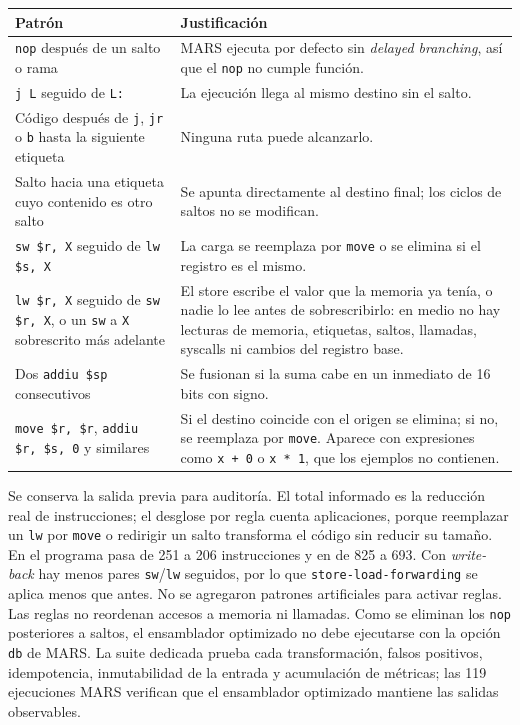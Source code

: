 \documentclass[11pt,letterpaper,oneside]{report}
\newcommand{\codigo}[1]{\texttt{#1}}
\newcommand{\archivo}[1]{\path{#1}}
\begin{document}
\begin{longtable}{p{5.4cm}p{7.4cm}}
\toprule
Patr\'on & Justificaci\'on\\\midrule
\endhead
\codigo{nop} despu\'es de un salto o rama & MARS ejecuta por defecto sin \emph{delayed branching}, as\'i que el \codigo{nop} no cumple funci\'on.\\
\codigo{j L} seguido de \codigo{L:} & La ejecuci\'on llega al mismo destino sin el salto.\\
C\'odigo despu\'es de \codigo{j}, \codigo{jr} o \codigo{b} hasta la siguiente etiqueta & Ninguna ruta puede alcanzarlo.\\
Salto hacia una etiqueta cuyo contenido es otro salto & Se apunta directamente al destino final; los ciclos de saltos no se modifican.\\
\codigo{sw \$r, X} seguido de \codigo{lw \$s, X} & La carga se reemplaza por \codigo{move} o se elimina si el registro es el mismo.\\
\codigo{lw \$r, X} seguido de \codigo{sw \$r, X}, o un \codigo{sw} a \codigo{X} sobrescrito m\'as adelante & El store escribe el valor que la memoria ya ten\'ia, o nadie lo lee antes de sobrescribirlo: en medio no hay lecturas de memoria, etiquetas, saltos, llamadas, syscalls ni cambios del registro base.\\
Dos \codigo{addiu \$sp} consecutivos & Se fusionan si la suma cabe en un inmediato de 16 bits con signo.\\
\codigo{move \$r, \$r}, \codigo{addiu \$r, \$s, 0} y similares & Si el destino coincide con el origen se elimina; si no, se reemplaza por \codigo{move}. Aparece con expresiones como \codigo{x + 0} o \codigo{x * 1}, que los ejemplos no contienen.\\
\bottomrule
\end{longtable}

Se conserva la salida previa para auditor\'ia. El total informado es la reducci\'on real de instrucciones; el desglose por regla cuenta aplicaciones, porque reemplazar un \codigo{lw} por \codigo{move} o redirigir un salto transforma el c\'odigo sin reducir su tama\~no. En \archivo{13\_programa\_integral.cps} el programa pasa de 251 a 206 instrucciones y en \archivo{valid\_complete.cps} de 825 a 693. Con \emph{write-back} hay menos pares \codigo{sw}/\codigo{lw} seguidos, por lo que \codigo{store-load-forwarding} se aplica menos que antes. No se agregaron patrones artificiales para activar reglas. Las reglas no reordenan accesos a memoria ni llamadas. Como se eliminan los \codigo{nop} posteriores a saltos, el ensamblador optimizado no debe ejecutarse con la opci\'on \codigo{db} de MARS. La suite dedicada prueba cada transformaci\'on, falsos positivos, idempotencia, inmutabilidad de la entrada y acumulaci\'on de m\'etricas; las 119 ejecuciones MARS verifican que el ensamblador optimizado mantiene las salidas observables.
\end{document}
